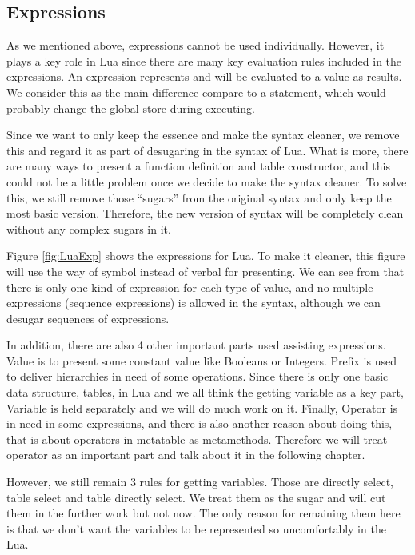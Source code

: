 \documentclass{article}
\begin{document}
\subsection{Expressions}
As we mentioned above, expressions cannot be used individually. However, it plays a key role in Lua since there are many key evaluation rules included in the expressions. An expression represents and will be evaluated to a value as results. We consider this as the main difference compare to a statement, which would probably change the global store during executing.

Since we want to only keep the essence and make the syntax cleaner, we remove this and regard it as part of desugaring in the syntax of Lua. What is more, there are many ways to present a function definition and table constructor, and this could not be a little problem once we decide to make the syntax cleaner. To solve this, we still remove those ``sugars'' from the original syntax and only keep the most basic version. Therefore, the new version of syntax will be completely clean without any complex sugars in it.

Figure \ref{fig:LuaExp} shows the expressions for Lua. To make it cleaner, this figure will use the way of symbol instead of verbal for presenting. We can see from that there is only one kind of expression for each type of value, and no multiple expressions (sequence expressions) is allowed in the syntax, although we can desugar sequences of expressions.

In addition, there are also 4 other important parts used assisting expressions. Value is to present some constant value like Booleans or Integers. Prefix is used to deliver hierarchies in need of some operations. Since there is only one basic data structure, tables, in Lua and we all think the getting variable as a key part, Variable is held separately and we will do much work on it. Finally, Operator is in need in some expressions, and there is also another reason about doing this, that is about operators in metatable as metamethods. Therefore we will treat operator as an important part and talk about it in the following chapter. 

However, we still remain 3 rules for getting variables. Those are directly select, table select and table directly select. We treat them as the sugar and will cut them in the further work but not now. The only reason for remaining them here is that we don't want the variables to be represented so uncomfortably in the Lua.
\end{document}
